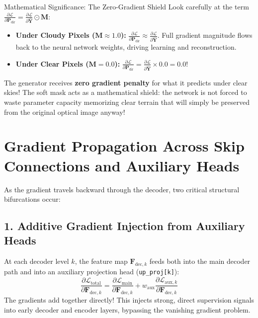 \begin{conceptbox}{Mathematical Significance: The Zero-Gradient Shield}
Look carefully at the term $\frac{\partial \mathcal{L}}{\partial \mathbf{P}_{\text{dir}}} = \frac{\partial \mathcal{L}}{\partial \hat{\mathbf{Y}}} \odot \mathbf{M}$:
\begin{itemize}
    \item \textbf{Under Cloudy Pixels ($\mathbf{M} \approx 1.0$):} $\frac{\partial \mathcal{L}}{\partial \mathbf{P}_{\text{dir}}} \approx \frac{\partial \mathcal{L}}{\partial \hat{\mathbf{Y}}}$. Full gradient magnitude flows back to the neural network weights, driving learning and reconstruction.
    \item \textbf{Under Clear Pixels ($\mathbf{M} = 0.0$):} $\frac{\partial \mathcal{L}}{\partial \mathbf{P}_{\text{dir}}} = \frac{\partial \mathcal{L}}{\partial \hat{\mathbf{Y}}} \times 0.0 = \mathbf{0.0}$!
\end{itemize}
The generator receives \textbf{zero gradient penalty} for what it predicts under clear skies! The soft mask acts as a mathematical shield: the network is not forced to waste parameter capacity memorizing clear terrain that will simply be preserved from the original optical image anyway!
\end{conceptbox}

\section{Gradient Propagation Across Skip Connections and Auxiliary Heads}
As the gradient travels backward through the decoder, two critical structural bifurcations occur:

\subsection{1. Additive Gradient Injection from Auxiliary Heads}
At each decoder level $k$, the feature map $\mathbf{F}_{\text{dec}, k}$ feeds both into the main decoder path and into an auxiliary projection head (\texttt{up\_proj[k]}):
\begin{equation}
\frac{\partial \mathcal{L}_{\text{total}}}{\partial \mathbf{F}_{\text{dec}, k}} = \frac{\partial \mathcal{L}_{\text{main}}}{\partial \mathbf{F}_{\text{dec}, k}} + w_{\text{aux}} \frac{\partial \mathcal{L}_{\text{aux}, k}}{\partial \mathbf{F}_{\text{dec}, k}}
\end{equation}
The gradients add together directly! This injects strong, direct supervision signals into early decoder and encoder layers, bypassing the vanishing gradient problem.

